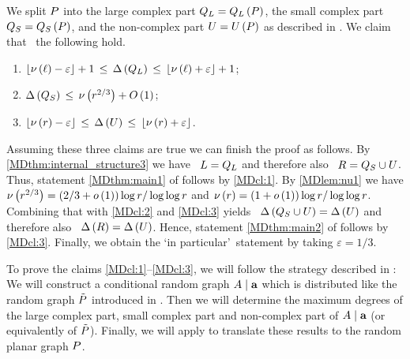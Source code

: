 We split $P$ into the large complex part $Q_L=Q_L\left(P\right)$, the small complex part $Q_S=Q_S\left(P\right)$, and the non-complex part $U=U\left(P\right)$ as described in . We claim that \whp\ the following hold.
\begin{enumerate}[label=(\roman*)]
\item\label{MDcl:1}
$\left\lfloor\nu\left(\ell\right)-\varepsilon\right\rfloor+1\hspace{0.06cm}\leq\hspace{0.06cm}\Delta\left(Q_L\right)\hspace{0.06cm}\leq\hspace{0.06cm}\left\lfloor\nu\left(\ell\right)+\varepsilon\right\rfloor+1$;
\item\label{MDcl:2}
$\Delta\left(Q_S\right)\hspace{0.06cm}\leq\hspace{0.06cm}\nu\left(r^{2/3}\right)+O\left(1\right)$;
\item\label{MDcl:3}
$\left\lfloor\nu\left(r\right)-\varepsilon\right\rfloor\hspace{0.06cm}\leq\hspace{0.06cm}\Delta\left(U\right)\hspace{0.06cm}\leq\hspace{0.06cm}\left\lfloor\nu\left(r\right)+\varepsilon\right\rfloor$.
\end{enumerate}
Assuming these three claims are true we can finish the proof as follows. By \ref{MDthm:internal_structure3} we have \whp\ $L=Q_L$ and therefore also \whp\ $R=Q_S\cup U$. Thus, statement \ref{MDthm:main1} of  follows by \ref{MDcl:1}. By \ref{MDlem:nu1} we have $\nu\left(r^{2/3}\right)=\left(2/3+o\left(1\right)\right)\log r/\log\log r$ and $\nu\left(r\right)=\left(1+o\left(1\right)\right)\log r/\log\log r$. Combining that with \ref{MDcl:2} and \ref{MDcl:3} yields \whp\ $\Delta\left(Q_S\cup U\right)=\Delta\left(U\right)$ and therefore also \whp\ $\Delta\left(R\right)=\Delta\left(U\right)$. Hence, statement \ref{MDthm:main2} of  follows by \ref{MDcl:3}. Finally, we obtain the \lq in particular\rq\ statement by taking $\varepsilon=1/3$.

To prove the claims \ref{MDcl:1}--\ref{MDcl:3}, we will follow the strategy described in : We will construct a conditional random graph $A \mid \mathbf{a}$ which is distributed like the random graph $\tilde{P}$ introduced in . Then we will determine the maximum degrees of the large complex part, small complex part and non-complex part of $A \mid \mathbf{a}$ (or equivalently of $\tilde{P}$). Finally, we will apply  to translate these results to the random planar graph $P$. 

